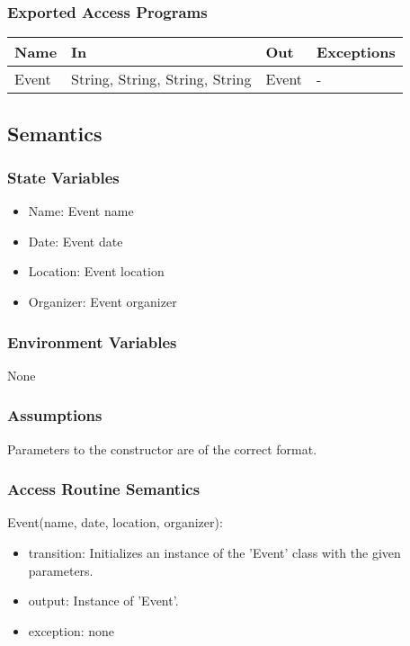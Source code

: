 \documentclass[12pt, titlepage]{article}
\begin{document}
\subsubsection{Exported Access Programs}
\begin{center}
\begin{tabular}{p{4cm} p{2cm} p{4cm} p{4cm}}
\hline
\textbf{Name} & \textbf{In} & \textbf{Out} & \textbf{Exceptions} \\
\hline
Event & String, String, String, String & Event & -\\
\hline
\end{tabular}
\end{center}

\subsection{Semantics}

\subsubsection{State Variables}

\begin{itemize}
\item Name: Event name
\item Date: Event date
\item Location: Event location
\item Organizer: Event organizer
\end{itemize}

\subsubsection{Environment Variables}

None

\subsubsection{Assumptions}

Parameters to the constructor are of the correct format.

\subsubsection{Access Routine Semantics}

\noindent Event(name, date, location, organizer):
\begin{itemize}
\item transition: Initializes an instance of the 'Event' class with the given parameters.
\item output: Instance of 'Event'.
\item exception: none
\end{itemize}
\end{document}
